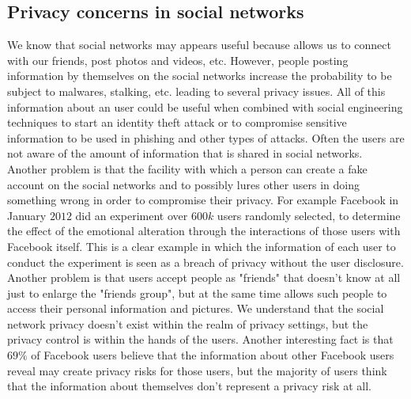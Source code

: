 \subsection{Privacy concerns in social networks}
We know that social networks may appears useful because allows us to connect with our friends, post photos and videos, etc. However, people posting information by themselves on the social networks increase the probability to be subject to malwares, stalking, etc. leading to several privacy issues. All of this information about an user could be useful when combined with social engineering techniques to start an identity theft attack or to compromise sensitive information to be used in phishing and other types of attacks. Often the users are not aware of the amount of information that is shared in social networks. Another problem is that the facility with which a person can create a fake account on the social networks and to possibly lures other users in doing something wrong in order to compromise their privacy. For example Facebook in January $2012$ did an experiment over $600k$ users randomly selected, to determine the effect of the emotional alteration through the interactions of those users with Facebook itself. This is a clear example in which the information of each user to conduct the experiment is seen as a breach of privacy without the user disclosure. Another problem is that users accept people as "friends" that doesn't know at all just to enlarge the "friends group", but at the same time allows such people to access their personal information and pictures. We understand that the social network privacy doesn't exist within the realm of privacy settings, but the privacy control is within the hands of the users. Another interesting fact is that $69 \%$ of Facebook users believe that the information about other Facebook users reveal may create privacy risks for those users, but the majority of users think that the information about themselves don't represent a privacy risk at all.